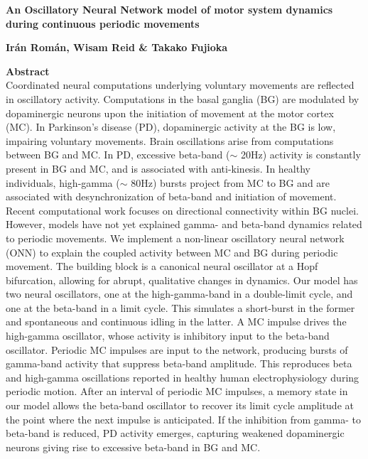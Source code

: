 \documentclass[12pt]{article}
\begin{document}
{\bf  
An Oscillatory Neural Network model of motor system dynamics during continuous periodic movements
}

{\bf
Ir\'{a}n Rom\'{a}n, Wisam Reid \& Takako Fujioka 
}



{\bf Abstract}\\
\noindent
Coordinated neural computations underlying voluntary movements are reflected in oscillatory activity. Computations in the basal ganglia (BG) are modulated by dopaminergic neurons upon the initiation of movement at the motor cortex (MC). In Parkinson's disease (PD), dopaminergic activity at the BG is low, impairing voluntary movements. Brain oscillations arise from computations between BG and MC. In PD, excessive beta-band ($\sim$ 20Hz) activity is constantly present in BG and MC, and is associated with anti-kinesis. In healthy individuals, high-gamma ($\sim$ 80Hz) bursts project from MC to BG and are associated with desynchronization of beta-band and initiation of movement. Recent computational work focuses on directional connectivity within BG nuclei. However, models have not yet explained gamma- and beta-band dynamics related to periodic movements. We implement a non-linear oscillatory neural network (ONN) to explain the coupled activity between MC and BG during periodic movement. The building block is a canonical neural oscillator at a Hopf bifurcation, allowing for abrupt, qualitative changes in dynamics. Our model has two neural oscillators, one at the high-gamma-band in a double-limit cycle, and one at the beta-band in a limit cycle. This simulates a short-burst in the former and spontaneous and continuous idling in the latter. A MC impulse drives the high-gamma oscillator, whose activity is inhibitory input to the beta-band oscillator. Periodic MC impulses are input to the network, producing bursts of gamma-band activity that suppress beta-band amplitude. This reproduces beta and high-gamma oscillations reported in healthy human electrophysiology during periodic motion. After an interval of periodic MC impulses, a memory state in our model allows the beta-band oscillator to recover its limit cycle amplitude at the point where the next impulse is anticipated. If the inhibition from gamma- to beta-band is reduced, PD activity emerges, capturing weakened dopaminergic neurons giving rise to excessive beta-band in BG and MC.  
\end{document}
